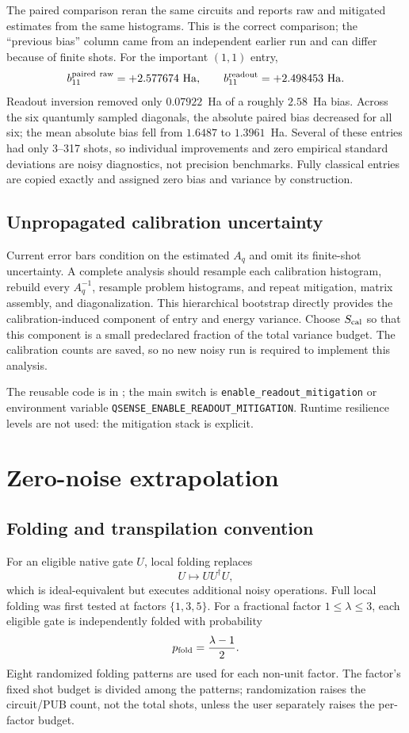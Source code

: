 \documentclass[11pt]{article}
\newcommand{\code}[1]{\texttt{#1}}
\begin{document}
The paired comparison reran the same circuits and reports raw and mitigated
estimates from the same histograms.  This is the correct comparison; the
``previous bias'' column came from an independent earlier run and can differ
because of finite shots.  For the important $(1,1)$ entry,
\[
  b_{11}^{\rm paired\ raw}=+2.577674\ \mathrm{Ha},\qquad
  b_{11}^{\rm readout}=+2.498453\ \mathrm{Ha}.
\]
Readout inversion removed only $0.07922$~Ha of a roughly $2.58$~Ha bias.
Across the six quantumly sampled diagonals, the absolute paired bias decreased
for all six; the mean absolute bias fell from $1.6487$ to $1.3961$~Ha.
Several of these entries had only 3--317 shots, so individual improvements and
zero empirical standard deviations are noisy diagnostics, not precision
benchmarks.  Fully classical entries are copied exactly and assigned zero
bias and variance by construction.

\subsection{Unpropagated calibration uncertainty}

Current error bars condition on the estimated $A_q$ and omit its finite-shot
uncertainty.  A complete analysis should resample each calibration histogram,
rebuild every $A_q^{-1}$, resample problem histograms, and repeat mitigation,
matrix assembly, and diagonalization.  This hierarchical bootstrap directly
provides the calibration-induced component of entry and energy variance.
Choose $S_{\rm cal}$ so that this component is a small predeclared fraction of
the total variance budget.  The calibration counts are saved, so no new noisy
run is required to implement this analysis.

The reusable code is in ; the main switch is
\code{enable\_readout\_mitigation} or environment variable
\code{QSENSE\_ENABLE\_READOUT\_MITIGATION}.  Runtime resilience levels are
not used: the mitigation stack is explicit.

\section{Zero-noise extrapolation}

\subsection{Folding and transpilation convention}

For an eligible native gate $U$, local folding replaces
\[
  U\longmapsto UU^\dagger U,
\]
which is ideal-equivalent but executes additional noisy operations.  Full
local folding was first tested at factors $\{1,3,5\}$.  For a fractional
factor $1\leq\lambda\leq3$, each eligible gate is independently folded with
probability
\[
  p_{\rm fold}=\frac{\lambda-1}{2}.
\]
Eight randomized folding patterns are used for each non-unit factor.  The
factor's fixed shot budget is divided among the patterns; randomization raises
the circuit/PUB count, not the total shots, unless the user separately raises
the per-factor budget.
\end{document}
